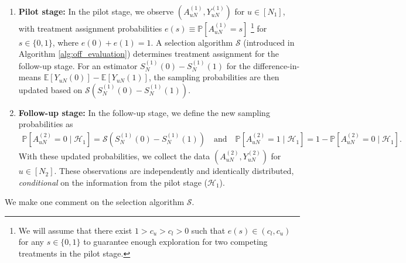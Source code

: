 \documentclass[12pt]{article}
\def\P{\mathbb{P}}
\def\P{\mathbb{P}}
\newcommand{\E}{\mathbb E}								%
\renewcommand{\P}{\mathbb{P}}							%
\begin{document}
\begin{enumerate}
    \item \textbf{Pilot stage:} 
    In the pilot stage, we observe \( (A_{uN}^{(1)}, Y_{uN}^{(1)}) \) for \( u \in [N_1] \), with treatment assignment probabilities \( e(s) \equiv \P[A_{uN}^{(1)} = s] \) \footnote{We will assume that there exist $1>c_u>c_l>0$ such that $e(s)\in(c_l,c_u)$ for any $s\in\{0,1\}$ to guarantee enough exploration for two competing treatments in the pilot stage.} for \( s \in \{0, 1\} \), where \( e(0) + e(1) = 1 \).  A selection algorithm \( \mathcal{S} \) (introduced in Algorithm \ref{alg:off_evaluation}) determines treatment assignment for the follow-up stage. 
	For an estimator $S_N^{(1)}(0)-S_N^{(1)}(1)$ for the difference-in-means $\E[Y_{uN}(0)]-\E[Y_{uN}(1)]$, the sampling probabilities are then updated based on $\mathcal{S}(S_N^{(1)}(0)-S_N^{(1)}(1))$.
	
    \item \textbf{Follow-up stage:} 
    In the follow-up stage, we define the new sampling probabilities as
	\small
	\begin{align*}
		\P[A_{uN}^{(2)} = 0 \mid \mathcal{H}_1] = \mathcal{S}(S_N^{(1)}(0) - S_N^{(1)}(1))\quad\text{and}\quad \P[A_{uN}^{(2)} = 1 \mid \mathcal{H}_1]=1-\P[A_{uN}^{(2)} = 0 \mid \mathcal{H}_1].
	\end{align*}
	\normalsize
	With these updated probabilities, we collect the data \( (A_{uN}^{(2)}, Y_{uN}^{(2)}) \) for \( u \in [N_2] \). These observations are independently and identically distributed, \textit{conditional} on the information from the pilot stage (\( \mathcal{H}_1 \)).
\end{enumerate}

We make one comment on the selection algorithm $\mathcal{S}$. 
\end{document}
